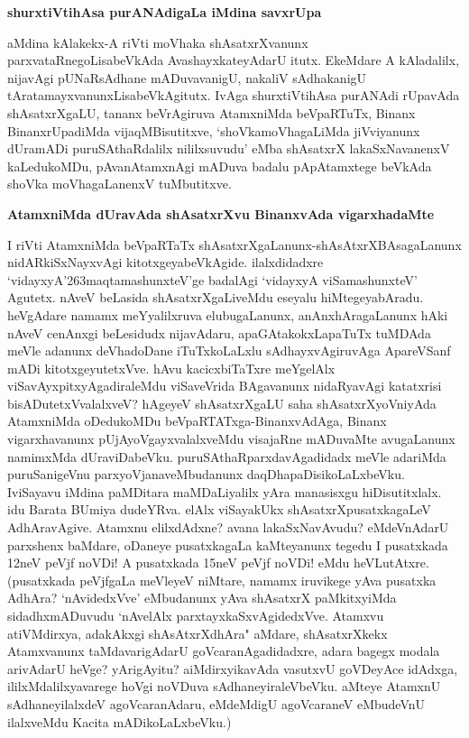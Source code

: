{\bigskip
\noindent
{\large\bf shurxtiVtihAsa purANAdigaLa iMdina savxrUpa}}\label{page187}
\medskip

\noindent
aMdina kAlakekx-A riVti moVhaka shAsatxrXvanunx parxvataRnegoLisabeVkAda Avashayxkate\-yAdarU itutx. EkeMdare A kAladalilx, nijavAgi pUNaRsAdhane mADuvavanigU, nakaliV sAdhakanigU tAratamayxvanunxLisabeVkAgitutx. IvAga shurxtiVtihAsa purANAdi rUpavAda shAsatxrXgaLU, tananx beVrAgiruva AtamxniMda beVpaR\-TuTx, Binanx BinanxrUpadiMda vijaqMBisutitxve, `shoVkamoVhagaLiMda jiVviyanunx dUramADi puruSAthaR\-dalilx nililxsuvudu' eMba shAsatxrX lakaSxNavanenxV kaLedukoMDu, pAvanAtamxnAgi mADuva badalu pApAtamxtege beVkAda shoVka moVhagaLanenxV tuMbutitxve.

{\bigskip
\noindent
{\large\bf AtamxniMda dUravAda shAsatxrXvu BinanxvAda vigarxhadaMte}}\label{page188}
\medskip

\noindent
I riVti AtamxniMda beVpaRTaTx shAsatxrXgaLanunx-shAsAtxrXBAsagaLanunx nidARkiSxNayxvAgi kitotxge\-yabeVkAgide. ilalxdidadxre `vidayxyA\char'263maqtamashunxteV'ge badalAgi `vidayxyA viSama\-shunxteV' Agutetx. nAveV beLasida shAsatxrX\-gaLiveMdu eseyalu hiMtegeyabAradu. heVgA\-dare namamx meYyalilxruva elubugaLanunx, anAnxhAra\-gaLanunx hAki nAveV cenAnxgi beLesidudx nijavAdaru, apaGAtakokxLapaTuTx tuMDAda meVle adanunx deVha\-doDane iTuTxkoLaLxlu sAdhayxvAgiruvAga ApareVSanf mADi kitotxgeyutetxVve. hAvu kacicx\-biTaTxre meYgelAlx viSavAyxpitxyAgadiraleMdu viSaveVrida BAgavanunx nidaRyavAgi katatxrisi bisADutetxVvalalxveV? hAgeyeV shAsatxrXgaLU saha shAsatxrXyoVniyAda AtamxniMda oDedu\-koMDu beVpaRTATxga-BinanxvAdAga, Binanx vigarxha\-vanunx pUjAyoVgayxvalalxveMdu visajaRne mADuvaMte avugaLanunx namimxMda dUraviDabeVku. puruSAthaRparxdavAga\-didadx meVle adariMda puruSanigeVnu parxyoVjanaveMbudanunx daqDhapaDisikoLaLxbeVku. I\break viSayavu iMdi\-na paMDitara maMDaLiyalilx yAra manasisxgu hiDisutitxlalx. idu Barata BUmiya dudeYRva. elAlx viSayakUkx shAsatxrXpusatxkagaLeV AdhAravAgive. Atamxnu elilxdAdxne? avana lakaSxNavAvudu? eMdeVnAdarU parxshenx baMdare, oDa\-neye pusatxkagaLa kaMteyanunx tegedu I pusatxkada 12neV peVjf noVDi! A pusatxkada 15neV peVjf noVDi! eMdu heVLutAtxre. (pusatxkada peVjfgaLa meVleyeV niMtare, namamx iruvikege yAva pusatxka AdhAra? `nAvidedxVve' eMbudanunx yAva shAsatxrX paMkitx\-yiMda sidadhxmADuvudu `nAvelAlx parxtayxkaSxvAgidedxVve. Atamxvu atiVMdirxya, adakAkxgi shAsAtxrXdhAra" aMdare, shAsatxrXkekx Atamxvanunx taMdavarigAdarU goVcaranAgadidadxre, adara bagegx modala arivAdarU heVge? yArigAyitu? aiMdirxyikavAda vasutxvU goVDeyAce idAdxga, ililxMdalilxyavarege hoVgi noVDuva sAdhaneyiraleVbeVku. aMteye AtamxnU sAdhaneyilalxdeV agoVcaranAdaru, eMdeMdigU agoVcaraneV eMbudeVnU ilalxveMdu Kacita mADikoLaLxbeVku.)

